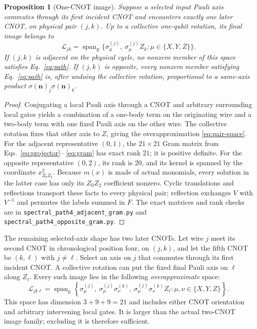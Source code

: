 \documentclass[11pt]{article}
\newtheorem{proposition}{Proposition}
\newcommand{\Span}{\operatorname{span}}
\begin{document}
\begin{proposition}[One-CNOT image]\label{prop:terminal}
Suppose a selected input Pauli axis commutes through its first incident
CNOT and encounters exactly one later CNOT, on physical pair $(j,k)$.
Up to a collective one-qubit rotation, its final image belongs to
\begin{equation}\label{eq:pair-space}
\mathcal L_{jk}=\Span_{\mathbb R}
 \{\sigma_\mu^{(j)},\ \sigma_\mu^{(j)}Z_k:
   \mu\in\{X,Y,Z\}\}.
\end{equation}
If $(j,k)$ is adjacent on the physical cycle, no nonzero member of this
space satisfies Eq.~\eqref{eq:path}.  If $(j,k)$ is opposite, every
nonzero member satisfying Eq.~\eqref{eq:path} is, after undoing the
collective rotation, proportional to a same-axis product
$\sigma(\mathbf n)_j\sigma(\mathbf n)_k$.
\end{proposition}

\begin{proof}
Conjugating a local Pauli axis through a CNOT and arbitrary surrounding
local gates yields a combination of a one-body term on the originating
wire and a two-body term with one fixed Pauli axis on the other wire.
The collective rotation fixes that other axis to $Z$, giving the
overapproximation \eqref{eq:pair-space}.  For the adjacent representative
$(0,1)$, the $21\times21$ Gram matrix from Eqs.~\eqref{eq:projector}--
\eqref{eq:gram} has exact rank $21$; it is positive definite.  For the
opposite representative $(0,2)$, its rank is $20$, and its kernel is
spanned by the coordinate $x_{Z_0Z_2}^{2}$.  Because $m(x)$ is made of
actual monomials, every solution in the latter case has only its
$Z_0Z_2$ coefficient nonzero.  Cyclic translations and reflections
transport these facts to every physical pair; reflection exchanges
$V$ with $V^{-1}$ and permutes the labels summed in $F$.
The exact matrices and rank checks are in
\texttt{spectral\_path4\_adjacent\_gram.py} and
\texttt{spectral\_path4\_opposite\_gram.py}.
\end{proof}

The remaining selected-axis shape has two later CNOTs.  Let wire $j$
meet its second CNOT in chronological position four, on $(j,k)$, and
let the fifth CNOT be $(k,\ell)$ with $j\ne\ell$.  Select an axis on $j$
that commutes through its first incident CNOT.  A collective rotation
can put the fixed final Pauli axis on $\ell$ along $Z_\ell$.  Every such
image lies in the following \emph{overapproximate} space:
\begin{equation}\label{eq:chain-space}
\mathcal L_{jk\ell}=\Span_{\mathbb R}
 \left\{\sigma_\mu^{(j)},\
 \sigma_\mu^{(j)}\sigma_\nu^{(k)},\
 \sigma_\mu^{(j)}\sigma_\nu^{(k)} Z_\ell:
 \mu,\nu\in\{X,Y,Z\}\right\}.
\end{equation}
This space has dimension $3+9+9=21$ and includes either CNOT
orientation and arbitrary intervening local gates.  It is larger than
the actual two-CNOT image family; excluding it is therefore sufficient.
\end{document}
